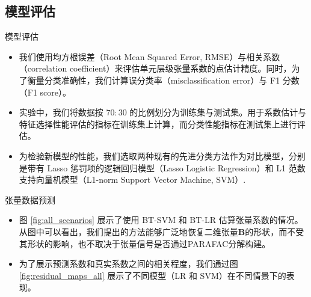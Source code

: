 \documentclass{beamer}
\begin{document}
	\subsection{模型评估}
	\begin{frame}{模型评估}
		\begin{itemize}[<+->]
			\item 我们使用均方根误差（Root Mean Squared Error, RMSE）与相关系数（correlation coefficient）来评估单元层级张量系数的点估计精度。同时，为了衡量分类准确性，我们计算误分类率（misclassification error）与 F1 分数（F1 score）。
			\item 实验中，我们将数据按 $70{:}30$ 的比例划分为训练集与测试集。用于系数估计与特征选择性能评估的指标在训练集上计算，而分类性能指标在测试集上进行评估。
			\item 为检验新模型的性能，我们选取两种现有的先进分类方法作为对比模型，分别是带有 Lasso 惩罚项的逻辑回归模型（Lasso Logistic Regression）和 L1 范数支持向量机模型（L1-norm Support Vector Machine, SVM）.
		\end{itemize}
	\end{frame}
	\begin{frame}{张量数据预测}
		\begin{itemize}[<+->]
			\item 图 \ref{fig:all_scenarios} 展示了使用 BT-SVM 和 BT-LR 估算张量系数的情况。从图中可以看出，我们提出的方法能够广泛地恢复二维张量$\bm{B}$的形状，而不受其形状的影响，也不取决于张量信号是否通过PARAFAC分解构建。
			\item 为了展示预测系数和真实系数之间的相关程度，我们通过图 \ref{fig:residual_maps_all} 展示了不同模型（LR 和 SVM）在不同情景下的表现。
		\end{itemize}
	\end{frame}
\end{document}
